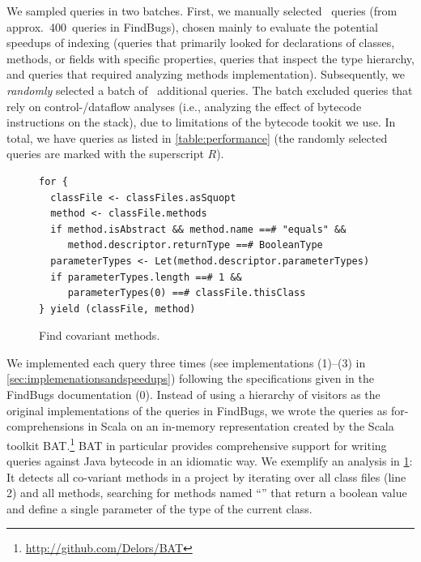 We sampled queries in two batches. First, we manually selected \manualQueryCount~queries (from approx.\ 400~queries in FindBugs), chosen mainly to evaluate the potential speedups of indexing (queries that primarily looked for declarations of classes, methods, or fields with specific properties, queries that inspect the type hierarchy, and queries that required analyzing methods implementation).
Subsequently, we \emph{randomly} selected a batch of \randomQueryCount~additional queries.
The batch excluded queries that rely on control-/dataflow analyses (i.e., analyzing the effect of bytecode instructions on the stack), due to limitations of the bytecode tookit we use.
In total, we have \queryCount{} queries as listed in \cref{table:performance} (the randomly selected queries are marked with the superscript $R$).




\begin{figure}
\centering
\begin{lstlisting}
for {
  classFile <- classFiles.asSquopt
  method <- classFile.methods
  if method.isAbstract && method.name ==# "equals" &&
     method.descriptor.returnType ==# BooleanType
  parameterTypes <- Let(method.descriptor.parameterTypes)
  if parameterTypes.length ==# 1 &&
     parameterTypes(0) ==# classFile.thisClass
} yield (classFile, method)
\end{lstlisting}
\caption{Find covariant  methods.}
\label{fig:covariant-equals}
\end{figure}



We implemented each query three times (see implementations (1)--(3) in \cref{sec:implemenationsandspeedups}) following the specifications given in the FindBugs documentation (0). Instead of using a hierarchy of visitors as the original implementations of the queries in FindBugs, we wrote the queries as for-comprehensions in Scala on an in-memory representation created by the Scala toolkit BAT\@.\footnote{\url{http://github.com/Delors/BAT}}
BAT in particular provides comprehensive support for
writing queries against Java bytecode in an idiomatic way.
We exemplify an analysis in \cref{fig:covariant-equals}: It detects all co-variant  methods in a project by iterating over all class files (line 2) and all methods, searching for methods named ``'' that return a boolean value and define a single parameter of the type of the current class.


